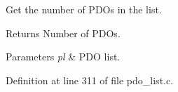 Get the number of P\-D\-Os in the list. 

\begin{DoxyReturn}{Returns}
Number of P\-D\-Os. 
\end{DoxyReturn}

\begin{DoxyParams}{Parameters}
{\em pl} & P\-D\-O list. \\
\hline
\end{DoxyParams}


Definition at line 311 of file pdo\-\_\-list.\-c.

